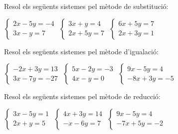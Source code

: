 \begin{activitats}
\begin{mylist}

\end{mylist}


 
\begin{mylist}


\exer  Resol els següents sistemes pel mètode de substitució:

\begin{tasks}
	\task  $\left\{\begin{array}{c} {2x-5y=-4} \\ {3x-y=7} \end{array}\right. $  
	\task  $\left\{\begin{array}{c} {3x+y=4} \\ {2x+5y=7} \end{array}\right. $  
	\task  $\left\{\begin{array}{c} {6x+5y=7} \\ {2x+3y=1} \end{array}\right. $
\end{tasks}
\answers{[$(3,2)$, $(1,1)$, $(2,-1)$]}

\exer  Resol els següents sistemes pel mètode d'igualació:

\begin{tasks}
	\task  $\left\{\begin{array}{c} {-2x+3y=13} \\ {3x-7y=-27} \end{array}\right. $  
	\task  $\left\{\begin{array}{c} {5x-2y=-3} \\ {4x-y=0} \end{array}\right. $  
	\task  $\left\{\begin{array}{c} {9x-5y=4} \\ {-8x+3y=-5} \end{array}\right. $
\end{tasks}
\answers{[$(-2,3)$, $(1,4)$, $(1,1)$]}


\exer  Resol els següents sistemes pel mètode de reducció:

\begin{tasks}
	\task  $\left\{\begin{array}{c} {3x-5y=1} \\ {2x+y=5} \end{array}\right. $   
	\task  $\left\{\begin{array}{c} {4x+3y=14} \\ {-x-6y=7} \end{array}\right. $  
	\task  $\left\{\begin{array}{c} {9x-5y=4} \\ {-7x+5y=-2} \end{array}\right. $
\end{tasks}
\answers{[$(2,1)$, $(5,-2)$, $(1,1)$]}



\end{mylist}
\end{activitats}
